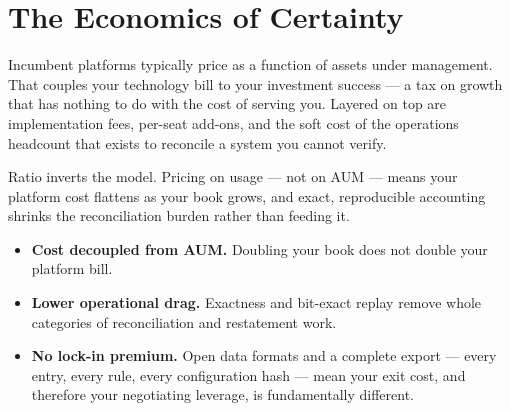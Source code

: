 \section{The Economics of Certainty}

Incumbent platforms typically price as a function of assets under management. That
couples your technology bill to your investment success --- a tax on growth that has
nothing to do with the cost of serving you. Layered on top are implementation fees,
per-seat add-ons, and the soft cost of the operations headcount that exists to
reconcile a system you cannot verify.

Ratio inverts the model. Pricing on usage --- not on AUM --- means your platform
cost flattens as your book grows, and exact, reproducible accounting shrinks the
reconciliation burden rather than feeding it.



\begin{itemize}
  \item \textbf{Cost decoupled from AUM.} Doubling your book does not double your
  platform bill.
  \item \textbf{Lower operational drag.} Exactness and bit-exact replay remove
  whole categories of reconciliation and restatement work.
  \item \textbf{No lock-in premium.} Open data formats and a complete export ---
  every entry, every rule, every configuration hash --- mean your exit cost, and
  therefore your negotiating leverage, is fundamentally different.
\end{itemize}
